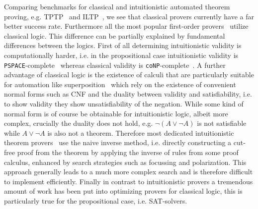 \documentclass[a4paper,UKenglish,cleveref, autoref, thm-restate]{lipics-v2021}
\begin{document}
Comparing benchmarks for classical and intuitionistic automated theorem proving, e.g. TPTP~\cite{casc} and ILTP~\cite{iltp}, we see that classical provers currently have a far better success rate. Furthermore all the most popular first-order provers~\cite{kovacs2013first, schulz2002brainiac, korovin2008iprover} utilize classical logic. This difference can be partially explained by fundamental differences between the logics. First of all determining intuitionistic validity is computationally harder, i.e. in the propositional case intuitionistic validity is \verb+PSPACE+-complete~\cite{statman1979intuitionistic} whereas classical validity is \verb+coNP+-complete~\cite{cook1971complexity}. A further advantage of classical logic is the existence of calculi that are particularly suitable for automation like superposition~\cite{bachmair2001resolution} which rely on the existence of convenient normal forms such as CNF and the duality between validity and satisfiability, i.e. to show validity they show unsatisfiability of the negation. While some kind of normal form is of course be obtainable for intuitionistic logic, albeit more complex, crucially the duality does not hold, e.g. $\neg(A\vee \neg A)$ is not satisfiable while $A\vee\neg A$ is also not a theorem. Therefore most dedicated intuitionistic theorem provers~\cite{mclaughlin2009efficient, tammet1996resolution} use the naive inverse method, i.e. directly constructing a cut-free proof from the theorem by applying the inverse of rules from some proof calculus, enhanced by search strategies such as focussing and polarization. This approach generally leads to a much more complex search and is therefore difficult to implement efficiently. Finally in contrast to intuitionistic provers a tremendous amount of work has been put into optimizing provers for classical logic, this is particularly true for the propositional case, i.e. SAT-solvers.
\end{document}
